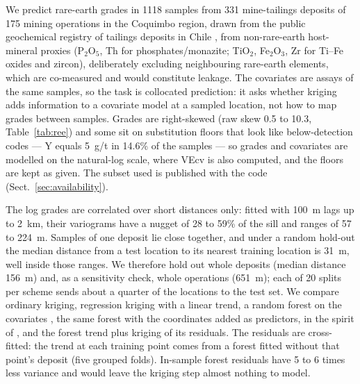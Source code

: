 \documentclass[pdflatex,sn-mathphys-ay]{sn-jnl}
\begin{document}
We predict rare-earth grades in 1118 samples from 331 mine-tailings
deposits of 175 mining operations in the Coquimbo region, drawn from the public
geochemical registry of tailings deposits in Chile \citep{sernageomin2023},
from non-rare-earth host-mineral proxies (P$_2$O$_5$, Th for
phosphates/monazite; TiO$_2$, Fe$_2$O$_3$, Zr for Ti--Fe oxides and zircon),
deliberately excluding neighbouring rare-earth elements, which are co-measured
and would constitute leakage. The covariates are assays of the same samples,
so the task is collocated prediction: it asks whether kriging adds information
to a covariate model at a sampled location, not how to map grades between
samples. Grades are right-skewed (raw skew 0.5 to 10.3, Table~\ref{tab:ree})
and some sit on substitution floors that look like below-detection codes ---
Y equals 5~g/t in 14.6\% of the samples --- so grades and covariates are
modelled on the natural-log scale, where VEcv is also computed, and the floors
are kept as given. The subset used is published with the code
(Sect.~\ref{sec:availability}).

The log grades are correlated over short distances only: fitted with 100~m lags
up to 2~km, their variograms have a nugget of 28 to 59\% of the sill and ranges
of 57 to 224~m. Samples of one deposit lie close together, and under a random
hold-out the median distance from a test location to its nearest training
location is 31~m, well inside those ranges. We therefore hold out whole
deposits (median distance 156~m) and, as a sensitivity check, whole operations
(651~m); each of 20 splits per scheme sends about a quarter of the locations
to the test set. We compare ordinary kriging, regression kriging with a linear
trend, a random forest on the covariates \citep{smelt}, the same forest with
the coordinates added as predictors, in the spirit of \citet{hengl2018}, and
the forest trend plus kriging of its residuals. The residuals are
cross-fitted: the trend at each training point comes from a forest fitted
without that point's deposit (five grouped folds). In-sample forest residuals
have 5 to 6 times less variance and would leave the kriging step almost nothing
to model.
\end{document}
